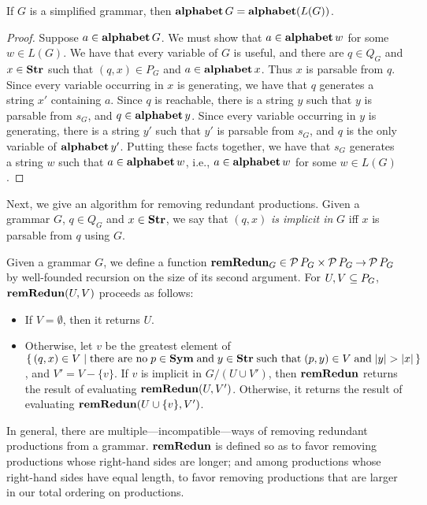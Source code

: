 \begin{proposition}
If $G$ is a simplified grammar, then $\mathbf{alphabet}\,G = \mathbf{alphabet}(L(G))$.
\end{proposition}

\begin{proof}
Suppose $a\in\mathbf{alphabet}\,G$.  We must show that $a\in\mathbf{alphabet}\,w$ for
some $w\in L(G)$.  We have that every variable of $G$ is useful, and
there are $q\in Q_G$ and $x\in\mathbf{Str}$ such that $(q,x)\in P_G$ and
$a\in\mathbf{alphabet}\,x$.  Thus $x$ is parsable from $q$.  Since every
variable occurring in $x$ is generating, we have that $q$ generates a
string $x'$ containing $a$.  Since $q$ is reachable, there is a string
$y$ such that $y$ is parsable from $s_G$, and $q\in\mathbf{alphabet}\,y$.
Since every variable occurring in $y$ is generating, there is a string
$y'$ such that $y'$ is parsable from $s_G$, and $q$ is the only
variable of $\mathbf{alphabet}\,y'$.  Putting these facts together, we have
that $s_G$ generates a string $w$ such that $a\in\mathbf{alphabet}\,w$, i.e.,
$a\in\mathbf{alphabet}\,w$ for some $w\in L(G)$.
\end{proof}

Next, we give an algorithm for removing redundant productions.
Given a grammar $G$, $q\in Q_G$ and $x\in\mathbf{Str}$, we say that
$(q,x)$ \emph{is implicit in} $G$ iff $x$ is parsable from $q$ using
$G$.

Given a grammar $G$, we define a function
$\mathbf{remRedun}_G\in{\cal P} \,P_G\times{\cal P} \,P_G\mathbin{\to}{\cal P} \,P_G$ by
well-founded recursion on the size of its second argument.
For $U,V\subseteq P_G$, $\mathbf{remRedun}(U, V)$ proceeds as follows:
\begin{itemize}
\item If $V=\emptyset$, then it returns $U$.

\item Otherwise, let $v$ be the greatest element of $\{ \, (q,x)\in
    V \mid \allowbreak\mbox{there are no}\allowbreak\; p\in\mathbf{Sym} \;\allowbreak\mbox{and}\allowbreak\; y\in\mathbf{Str} \;\allowbreak\mbox{such
      that}\allowbreak\; (p,y)\in V \;\allowbreak\mbox{and}\allowbreak\; |y| > |x| \, \}$, and $V' = V - \{v\}$.
  If $v$ is implicit in $G/(U\cup V')$, then $\mathbf{remRedun}$ returns the
  result of evaluating $\mathbf{remRedun}(U, V')$.  Otherwise, it returns the
  result of evaluating $\mathbf{remRedun}(U \cup \{v\}, V')$.
\end{itemize}

In general, there are multiple---incompatible---ways of removing
redundant productions from a grammar.  $\mathbf{remRedun}$ is defined so as to
favor removing productions whose right-hand sides are longer; and
among productions whose right-hand sides have equal length, to favor
removing productions that are larger in our total ordering on
productions.


